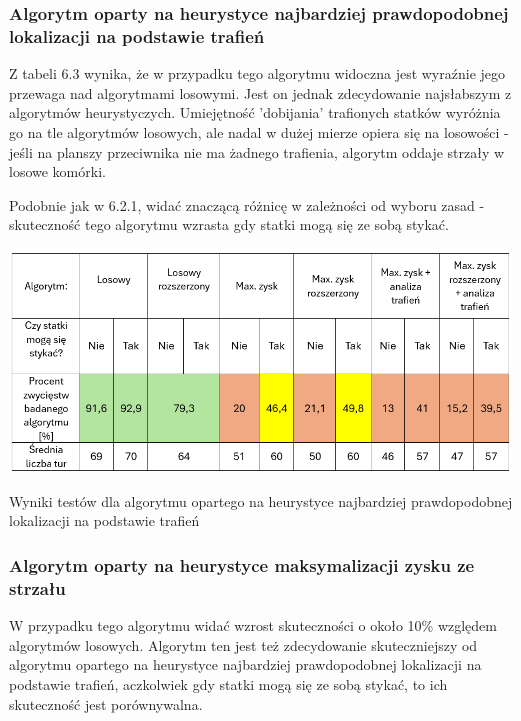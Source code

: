 \subsubsection{Algorytm oparty na heurystyce najbardziej prawdopodobnej lokalizacji na podstawie trafień}

Z tabeli 6.3 wynika, że w przypadku tego algorytmu widoczna jest wyraźnie jego przewaga nad algorytmami losowymi. Jest on jednak zdecydowanie najsłabszym z algorytmów heurystyczych. Umiejętność 'dobijania' trafionych statków wyróżnia go na tle algorytmów losowych, ale nadal w dużej mierze opiera się na losowości - jeśli na planszy przeciwnika nie ma żadnego trafienia, algorytm oddaje strzały w losowe komórki.

Podobnie jak w 6.2.1, widać znaczącą różnicę w zależności od wyboru zasad - skuteczność tego algorytmu wzrasta gdy statki mogą się ze sobą stykać.

\begin{table}[!h]
    \centering
    \includegraphics[width=1\linewidth]{img/table-hit-heuristic.png}
    \caption{Wyniki testów dla algorytmu opartego na heurystyce najbardziej prawdopodobnej lokalizacji na podstawie trafień}
\end{table}

\subsubsection{Algorytm oparty na heurystyce maksymalizacji zysku ze strzału}

W przypadku tego algorytmu widać wzrost skuteczności o około 10\% względem algorytmów losowych. Algorytm ten jest też zdecydowanie skuteczniejszy od algorytmu opartego na heurystyce najbardziej prawdopodobnej lokalizacji na podstawie trafień, aczkolwiek gdy statki mogą się ze sobą stykać, to ich skuteczność jest porównywalna.

